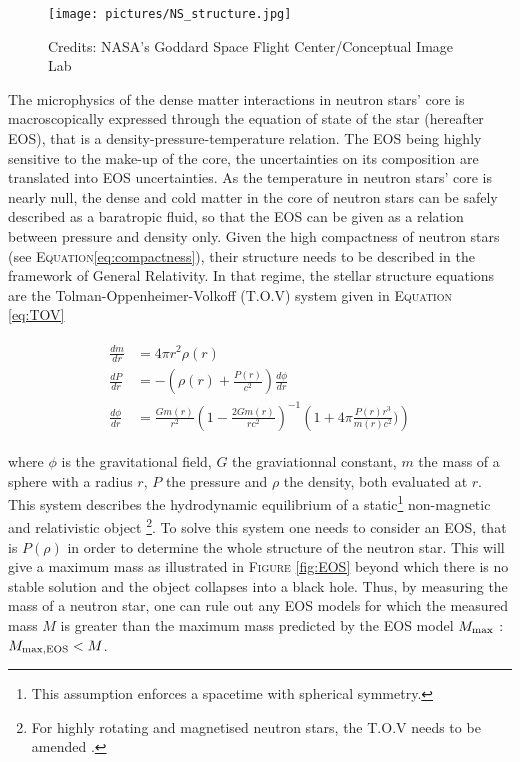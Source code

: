 \documentclass[a4paper, twoside, 12pt]{article}
\numberwithin{equation}{section}
\begin{document}
 \begin{wrapfigure}{r}{0.4\textwidth}
  \texttt{[image: pictures/NS\_structure.jpg]}
  \caption[Structure of a neutron star ]{Credits: NASA’s Goddard Space Flight Center/Conceptual Image Lab }
  \label{fig:NS_structure}
\end{wrapfigure}



\hspace{\parindent}	 The microphysics of the dense matter interactions in neutron stars' core is macroscopically  expressed through the equation of state of the star (hereafter EOS), that is a density-pressure-temperature relation. 
The EOS being highly sensitive to the make-up of the core, the uncertainties on its composition are translated into EOS uncertainties.  As the temperature in neutron stars' core is nearly null, the dense and cold matter in the core of neutron stars can be safely described as a baratropic fluid, so that the EOS can be given as a relation between pressure and density only. Given the high compactness of neutron stars (see E\textsc{quation}\ref{eq:compactness}), their structure needs to be described in the framework of General Relativity. In that regime, the stellar structure equations are the Tolman-Oppenheimer-Volkoff (T.O.V) system\cite{TOV_2} \cite{TOV_system} given in E\textsc{quation}  \ref{eq:TOV}  

\begin{align}
\label{eq:TOV}
\begin{split}
\frac{d{m}}{dr} &= 4 \pi r^2 \rho\left(r\right) \\
 \frac{dP}{dr} &= - \left( \rho(r) + \frac{P(r)}{c^2}\right) \frac{d\phi}{dr} \\
\frac{d\phi}{dr} &= \frac{Gm(r)}{r^2} \left(1 - \frac{2Gm(r)}{rc^2}\right)^{-1} \left(1 + 4\pi \frac{P(r)r^3}{m(r)c^2})\right) 
\end{split}%
\end{align}


\noindent where $\phi$ is the gravitational field,  $G$ the graviationnal constant, $m$ the mass of a sphere with a radius $r$, $P$ the pressure and $\rho$  the density, both evaluated at $r$.  
This system  describes the hydrodynamic equilibrium of a static\footnote{This assumption enforces a spacetime with spherical symmetry. } non-magnetic and relativistic object \footnote{For highly rotating and magnetised neutron stars, the T.O.V needs to be amended \cite{Riley+19}.}. To solve this system one needs to consider an EOS, that is $P(\rho)$ in order to determine the whole structure of the neutron star. This will give a maximum mass as illustrated in F\textsc{igure} \ref{fig:EOS} beyond which there is no stable solution and the object collapses into a black hole.  Thus, by measuring the mass of a neutron star, one can rule out any EOS models for which the measured mass $M$ is greater than the maximum mass predicted by the EOS model $M_{\rm{max}}$ : $M_{\rm{max, EOS}} < M$.   \\
\end{document}
